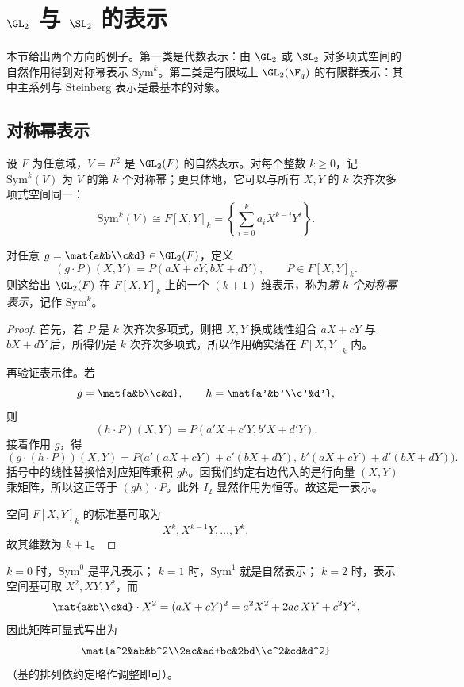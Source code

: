 \section{$\GL_2$ 与 $\SL_2$ 的表示}

本节给出两个方向的例子。第一类是代数表示：由 $\GL_2$ 或 $\SL_2$ 对多项式空间的自然作用得到对称幂表示 $\mathrm{Sym}^k$。第二类是有限域上 $\GL_2(\F_q)$ 的有限群表示：其中主系列与 Steinberg 表示是最基本的对象。

\subsection*{对称幂表示}

设 $F$ 为任意域，$V=F^2$ 是 $\GL_2(F)$ 的自然表示。对每个整数 $k\ge 0$，记 $\mathrm{Sym}^k(V)$ 为 $V$ 的第 $k$ 个对称幂；更具体地，它可以与所有 $X,Y$ 的 $k$ 次齐次多项式空间同一：
\[
\mathrm{Sym}^k(V)\cong F[X,Y]_k=
\left\{\sum_{i=0}^k a_iX^{k-i}Y^i\right\}.
\]

\begin{proposition}
对任意 $g=\mat{a&b\\c&d}\in \GL_2(F)$，定义
\[
(g\cdot P)(X,Y)=P(aX+cY,bX+dY),\qquad P\in F[X,Y]_k.
\]
则这给出 $\GL_2(F)$ 在 $F[X,Y]_k$ 上的一个 $(k+1)$ 维表示，称为\emph{第 $k$ 个对称幂表示}，记作 $\mathrm{Sym}^k$。
\end{proposition}

\begin{proof}
首先，若 $P$ 是 $k$ 次齐次多项式，则把 $X,Y$ 换成线性组合 $aX+cY$ 与 $bX+dY$ 后，所得仍是 $k$ 次齐次多项式，所以作用确实落在 $F[X,Y]_k$ 内。

再验证表示律。若
\[
g=\mat{a&b\\c&d},\qquad h=\mat{a'&b'\\c'&d'},
\]
则
\[
(h\cdot P)(X,Y)=P(a'X+c'Y,b'X+d'Y).
\]
接着作用 $g$，得
\[
(g\cdot (h\cdot P))(X,Y)
=P\bigl(a'(aX+cY)+c'(bX+dY),\ b'(aX+cY)+d'(bX+dY)\bigr).
\]
括号中的线性替换恰对应矩阵乘积 $gh$。因我们约定右边代入的是行向量 $(X,Y)$ 乘矩阵，所以这正等于 $(gh)\cdot P$。此外 $I_2$ 显然作用为恒等。故这是一表示。

空间 $F[X,Y]_k$ 的标准基可取为
\[
X^k,X^{k-1}Y,\dots,Y^k,
\]
故其维数为 $k+1$。
\end{proof}

\begin{example}
$k=0$ 时，$\mathrm{Sym}^0$ 是平凡表示；
$k=1$ 时，$\mathrm{Sym}^1$ 就是自然表示；
$k=2$ 时，表示空间基可取 $X^2,XY,Y^2$，而
\[
\mat{a&b\\c&d}\cdot X^2=(aX+cY)^2=a^2X^2+2ac\,XY+c^2Y^2,
\]
因此矩阵可显式写出为
\[
\mat{a^2&ab&b^2\\2ac&ad+bc&2bd\\c^2&cd&d^2}
\]
（基的排列依约定略作调整即可）。
\end{example}

